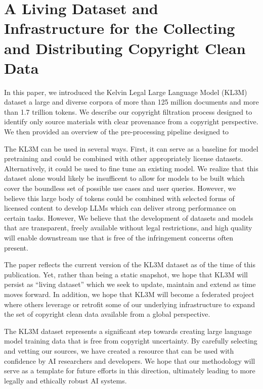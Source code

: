\section{A Living Dataset and Infrastructure for the Collecting and Distributing Copyright Clean Data}
In this paper, we introduced the Kelvin Legal Large Language Model (KL3M) dataset a large and diverse corpora of more than 125 million documents and more than 1.7 trillion tokens.  We describe our copyright filtration process designed to identify only source materials with clear provenance from a copyright perspective.  We then provided an overview of the pre-processing pipeline designed to 





The KL3M can be used in several ways.  First, it can serve as a baseline for model pretraining and could be combined with other appropriately license datasets.  Alternatively, it could be used to fine tune an existing model.  We realize that this dataset alone would likely be insufficent to allow for models to be built which cover the boundless set of possible use cases and user queries.  However, we believe this large body of tokens could be combined with selected forms of licensed content to develop LLMs which can deliver strong performance on certain tasks.  However, 
We believe that the development of datasets and models that are transparent, freely available without legal restrictions, and high quality will enable downstream use that is free of the infringement concerns often present.


The paper reflects the current version of the KL3M dataset as of the time of this publication.  Yet, rather than being a static snapshot, we hope that KL3M will persist as ``living dataset'' which we seek to update, maintain and extend as time moves forward.  In addition, we hope that KL3M will become a federated project where others leverage or retrofit some of our underlying infrastructure to expand the set of copyright clean data available from a global perspective.  

The KL3M dataset represents a significant step towards creating large language model training data that is free from copyright uncertainty. By carefully selecting and vetting our sources, we have created a resource that can be used with confidence by AI researchers and developers. We hope that our methodology will serve as a template for future efforts in this direction, ultimately leading to more legally and ethically robust AI systems.

